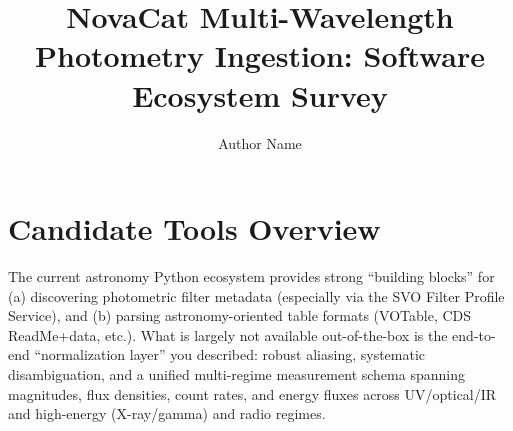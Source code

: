\documentclass[twocolumn]{aastex701}
\begin{document}
\title{NovaCat Multi-Wavelength Photometry Ingestion: Software Ecosystem Survey}

\author{Author Name}

\section{Candidate Tools Overview}

The current astronomy Python ecosystem provides strong “building blocks” for (a) discovering photometric filter metadata (especially via the SVO Filter Profile Service), and (b) parsing astronomy-oriented table formats (VOTable, CDS ReadMe+data, etc.). What is largely not available out-of-the-box is the end-to-end “normalization layer” you described: robust aliasing, systematic disambiguation, and a unified multi-regime measurement schema spanning magnitudes, flux densities, count rates, and energy fluxes across UV/optical/IR and high-energy (X-ray/gamma) and radio regimes. \citep{ref1}

\newpage
\end{document}
